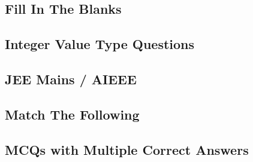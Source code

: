 \subsection*{Fill In The Blanks}
\begin{enumerate}[label=\thesubsection.\arabic*,ref=\thesubsection.\theenumi]




\end{enumerate}
\subsection*{Integer Value Type Questions}
\begin{enumerate}[label=\thesubsection.\arabic*,ref=\thesubsection.\theenumi]




\end{enumerate}
\subsection*{JEE Mains / AIEEE}
\begin{enumerate}[label=\thesubsection.\arabic*,ref=\thesubsection.\theenumi]




\end{enumerate}
\subsection*{Match The Following}
\begin{enumerate}[label=\thesubsection.\arabic*,ref=\thesubsection.\theenumi]




\end{enumerate}
\subsection*{MCQs with Multiple Correct Answers}
\begin{enumerate}[label=\thesubsection.\arabic*,ref=\thesubsection.\theenumi]




\end{enumerate}
